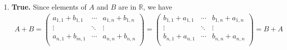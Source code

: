 \documentclass{article}
\begin{document}
\begin{enumerate}
    \item \textbf{True.} Since elements of $A$ and $B$ are in $\mathbb{R}$, we have
    \begin{align*}
        A + B
        =
        \begin{pmatrix}
            a_{1,1} + b_{1,1} & \cdots & a_{1,n} + b_{1,n} \\
            \vdots & \ddots & \vdots \\
            a_{n,1} + b_{m,1} & \cdots & a_{n,n} + b_{n,n} \\
        \end{pmatrix}
        =
        \begin{pmatrix}
            b_{1,1} + a_{1,1} & \cdots & b_{1,n} + a_{1,n} \\
            \vdots & \ddots & \vdots \\
            b_{n,1} + a_{n,1} & \cdots & b_{n,n} + a_{n,n} \\
        \end{pmatrix}
        =
        B + A
    \end{align*}


\end{enumerate}
\end{document}

